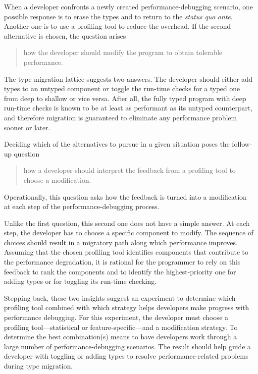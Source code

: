 
When a developer confronts a newly created performance-debugging scenario, one
possible response is to erase the types and to return to the {\em status quo
ante\/}.  Another one is to use a profiling tool to reduce the overhead. If the
second alternative is chosen, the question arises 
\begin{quote} \em

 how the developer should modify the program to obtain tolerable performance.
 
\end{quote}   
The type-migration lattice suggests two answers.  The developer should either
add types to an untyped component or toggle the run-time checks for a typed one
from deep to shallow or vice versa.  After all, the fully typed program with
deep run-time checks is known to be at least as performant as its untyped
counterpart, and therefore migration is guaranteed to eliminate any performance
problem sooner or later.

Deciding which of the alternatives to pursue in a given situation poses the
follow-up question 
\begin{quote} \em

how a developer should interpret the feedback from a profiling tool to
choose a modification.

\end{quote}   
Operationally, this question asks how the feedback is turned into a
modification at each step of the performance-debugging process.

Unlike the first question, this second one does not have a simple answer.  At
each step, the developer has to choose a specific component to modify.  The
sequence of choices should result in a migratory path along which performance
improves. Assuming that the chosen profiling tool identifies components that
contribute to the performance degradation, it is rational for the programmer to
rely on this feedback to rank the components and to identify the
highest-priority one for adding types or for toggling its run-time checking.

Stepping back, these two insights suggest an experiment to determine which
profiling tool combined with which strategy helps developers make progress with
performance debugging. For this experiment, the developer must choose a
profiling tool---statistical or feature-specific---and a modification strategy.
To determine the best combination(s) means to have developers work through a
large number of performance-debugging scenarios. The result should help guide a
developer with toggling or adding types to resolve performance-related
problems during type migration.


